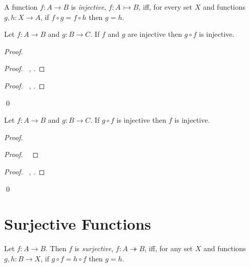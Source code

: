 \begin{df}[Injective]
  A function $f : A \rightarrow B$ is \emph{injective}, $f : A
  \rightarrowtail B$, iff, for every set $X$ and functions $g, h : X
  \rightarrow
  A$, if $f \circ g = f \circ h$ then $g = h$.
\end{df}

\begin{prop}
\label{prop:sets:injective:comp}
 Let $f : A \rightarrow B$ and $g : B \rightarrow C$. If $f$ and $g$ are
injective then $g \circ f$ is injective.
\end{prop}

\begin{proof}
 \pf
 \begin{proof}
   \pf\ , .
  \end{proof}
 \begin{proof}
   \pf\ , .
 \end{proof}
 \qed
\end{proof}

\begin{prop}
  \label{prop:sets:injective:compr}
 Let $f : A \rightarrow B$ and $g : B \rightarrow C$. If $g \circ f$ is
injective then $f$ is injective.
\end{prop}

\begin{proof}
 \pf
 \begin{proof}
   \pf\ 
 \end{proof}
 \begin{proof}
   \pf\ , .
 \end{proof}
 \qed
\end{proof}

\section{Surjective Functions}

\begin{df}[Surjective]
  Let $f : A \rightarrow B$. Then $f$ is \emph{surjective}, $f : A
\twoheadrightarrow B$, iff, for any set
  $X$ and functions $g, h : B \rightarrow X$, if $g \circ f = h \circ f$ then
  $g
  = h$.
\end{df}

